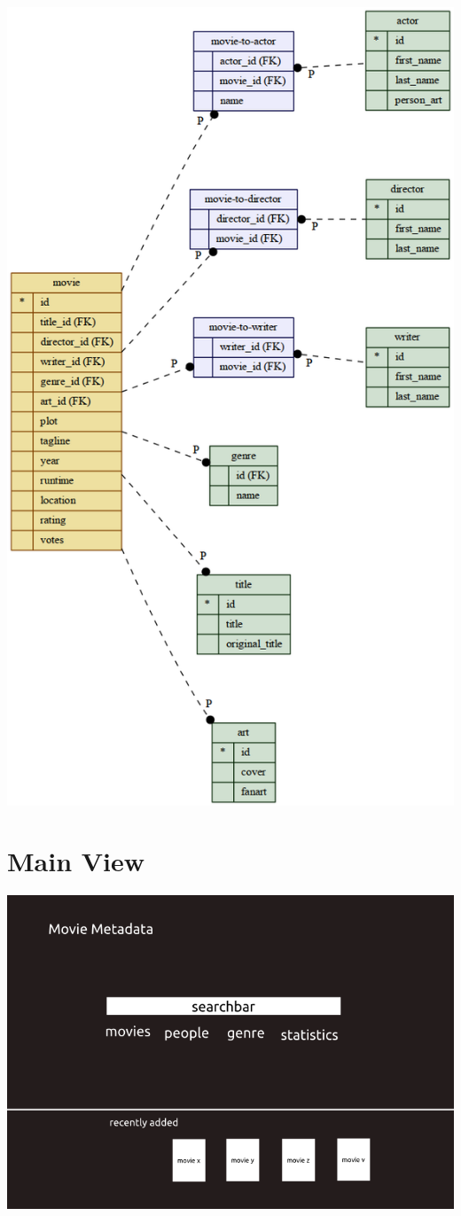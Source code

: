 \documentclass[a4paper]{article}
\begin{document}
\includegraphics[scale=0.700000]{./dataschema.png}


\section{Main View%
  \label{main-view}%
}

\includegraphics{./mainview.png}
\end{document}
